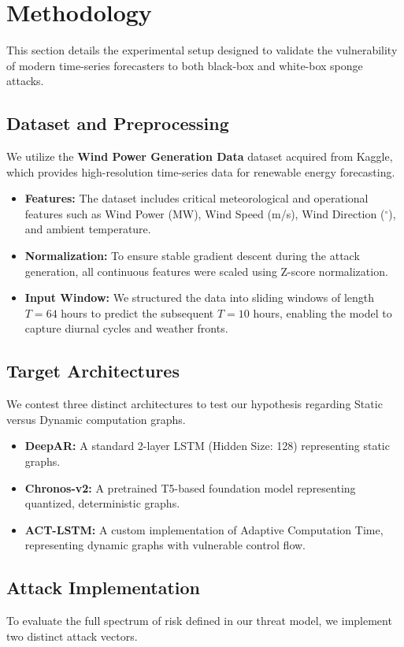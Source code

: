 \documentclass[conference]{IEEEtran}
\begin{document}
\section{Methodology}
\label{sec:experiments}

This section details the experimental setup designed to validate the vulnerability of modern time-series forecasters to both black-box and white-box sponge attacks.

\subsection{Dataset and Preprocessing}
We utilize the \textbf{Wind Power Generation Data} dataset acquired from Kaggle, which provides high-resolution time-series data for renewable energy forecasting.
\begin{itemize}
    \item \textbf{Features:} The dataset includes critical meteorological and operational features such as Wind Power (MW), Wind Speed (m/s), Wind Direction ($^\circ$), and ambient temperature.
    \item \textbf{Normalization:} To ensure stable gradient descent during the attack generation, all continuous features were scaled using Z-score normalization.
    \item \textbf{Input Window:} We structured the data into sliding windows of length $T=64$ hours to predict the subsequent $T=10$ hours, enabling the model to capture diurnal cycles and weather fronts.
\end{itemize}

\subsection{Target Architectures}
We contest three distinct architectures to test our hypothesis regarding Static versus Dynamic computation graphs.
\begin{itemize}
    \item \textbf{DeepAR:} A standard 2-layer LSTM (Hidden Size: 128) representing static graphs.
    \item \textbf{Chronos-v2:} A pretrained T5-based foundation model representing quantized, deterministic graphs.
    \item \textbf{ACT-LSTM:} A custom implementation of Adaptive Computation Time, representing dynamic graphs with vulnerable control flow.
\end{itemize}

\subsection{Attack Implementation}
To evaluate the full spectrum of risk defined in our threat model, we implement two distinct attack vectors.
\end{document}
